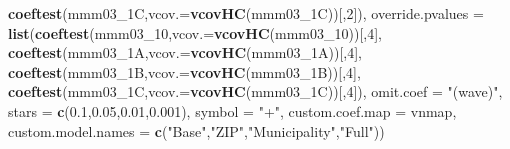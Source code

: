 \documentclass[
]{article}
\newenvironment{Shaded}{\begin{snugshade}}{\end{snugshade}}
\newcommand{\DataTypeTok}[1]{\textcolor[rgb]{0.13,0.29,0.53}{#1}}
\newcommand{\DecValTok}[1]{\textcolor[rgb]{0.00,0.00,0.81}{#1}}
\newcommand{\FloatTok}[1]{\textcolor[rgb]{0.00,0.00,0.81}{#1}}
\newcommand{\KeywordTok}[1]{\textcolor[rgb]{0.13,0.29,0.53}{\textbf{#1}}}
\newcommand{\NormalTok}[1]{#1}
\newcommand{\StringTok}[1]{\textcolor[rgb]{0.31,0.60,0.02}{#1}}
\begin{document}
\begin{Shaded}
\begin{Highlighting}[]
                             \KeywordTok{coeftest}\NormalTok{(mmm03_1C,}\DataTypeTok{vcov.=}\KeywordTok{vcovHC}\NormalTok{(mmm03_1C))[,}\DecValTok{2}\NormalTok{]),}
          \DataTypeTok{override.pvalues =} \KeywordTok{list}\NormalTok{(}\KeywordTok{coeftest}\NormalTok{(mmm03_}\DecValTok{10}\NormalTok{,}\DataTypeTok{vcov.=}\KeywordTok{vcovHC}\NormalTok{(mmm03_}\DecValTok{10}\NormalTok{))[,}\DecValTok{4}\NormalTok{],}
                                  \KeywordTok{coeftest}\NormalTok{(mmm03_1A,}\DataTypeTok{vcov.=}\KeywordTok{vcovHC}\NormalTok{(mmm03_1A))[,}\DecValTok{4}\NormalTok{],}
                                  \KeywordTok{coeftest}\NormalTok{(mmm03_1B,}\DataTypeTok{vcov.=}\KeywordTok{vcovHC}\NormalTok{(mmm03_1B))[,}\DecValTok{4}\NormalTok{],}
                                  \KeywordTok{coeftest}\NormalTok{(mmm03_1C,}\DataTypeTok{vcov.=}\KeywordTok{vcovHC}\NormalTok{(mmm03_1C))[,}\DecValTok{4}\NormalTok{]),}
          \DataTypeTok{omit.coef =} \StringTok{"(wave)"}\NormalTok{, }\DataTypeTok{stars =} \KeywordTok{c}\NormalTok{(}\FloatTok{0.1}\NormalTok{,}\FloatTok{0.05}\NormalTok{,}\FloatTok{0.01}\NormalTok{,}\FloatTok{0.001}\NormalTok{), }\DataTypeTok{symbol =} \StringTok{"+"}\NormalTok{,}
          \DataTypeTok{custom.coef.map =}\NormalTok{ vnmap, }
          \DataTypeTok{custom.model.names =} \KeywordTok{c}\NormalTok{(}\StringTok{"Base"}\NormalTok{,}\StringTok{"ZIP"}\NormalTok{,}\StringTok{"Municipality"}\NormalTok{,}\StringTok{"Full"}\NormalTok{))}
\end{Highlighting}
\end{Shaded}
\end{document}
